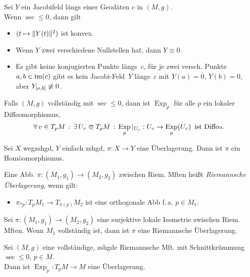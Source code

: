\documentclass{cheat-sheet}
\DeclareMathOperator{\Exp}{Exp} %
\begin{document}
\begin{satz}
  Sei $Y$ ein Jacobifeld längs einer Geodäten $c$ in $(M, g)$. \\
  Wenn $\sec \leq 0$, dann gilt
  \begin{itemize}
    \item $(t \mapsto \lVert Y(t)\rVert^2)$ ist konvex.
    \item Wenn $Y$ zwei verschiedene Nullstellen hat, dann $Y \equiv 0$.
    \item Es gibt keine konjugierten Punkte längs~$c$, \dh{} für je zwei versch. Punkte $a, b \in \operatorname{im}(c)$ gibt es kein Jacobi-Feld~$Y$ längs~$c$ mit $Y(a) = 0$, $Y(b) = 0$, aber $Y_{\left[ a, b \right]} \not\equiv 0$.
  \end{itemize}
\end{satz}

\begin{kor}
  Falls $(M, g)$ vollständig mit $\sec \leq 0$, dann ist $\Exp_p$ für alle $p$ ein lokaler Diffeomorphismus, \dh{}
  \[
    \fa{v \in T_p M} \ex{U_v \opn T_p M} \Exp_p |_{U_v} : U_v \to \Exp_p(U_v)
    \enspace \text{ist Diffeo.}
  \]
\end{kor}

\begin{wdh}
  Sei $X$ wegzshgd, $Y$ einfach zshgd, $\pi : X \to Y$ eine Überlagerung. Dann ist $\pi$ ein Homöomorphismus.
\end{wdh}

\begin{defn}
  Eine Abb. $\pi : (M_1, g_1) \to (M_2, g_2)$ zwischen Riem. Mften heißt \emph{Riemannsche Überlagerung}, wenn gilt:
  \begin{itemize}
    \item $\pi_{*p} : T_p M_1 \to T_{\pi(p)} M_2$ ist eine orthogonale Abb f.\,a. $p \in M_1$.
  \end{itemize}
\end{defn}

\begin{satz}
  Sei $\pi : (M_1, g_1) \to (M_2, g_2)$ eine surjektive lokale Isometrie zwischen Riem. Mften. Wenn $M_1$ vollständig ist, dann ist $\pi$ eine Riemannsche Überlagerung.
\end{satz}

\begin{satz}
  Sei $(M, g)$ eine vollständige, zshgde Riemannsche Mft. mit Schnittkrümmung $\sec \leq 0$, $p \in M$. \\
  Dann ist $\Exp_p : T_p M \to M$ eine Überlagerung.
\end{satz}
\end{document}
